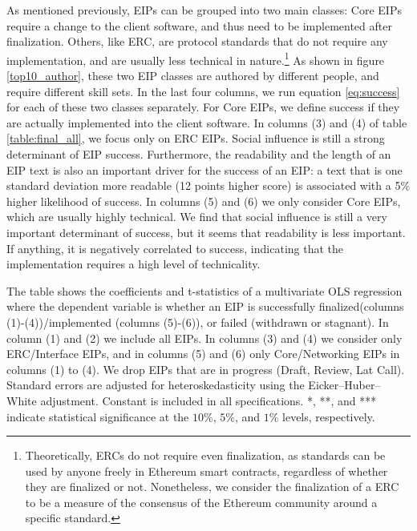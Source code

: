 \documentclass[No]{AEA}
\begin{document}
 As mentioned previously, EIPs can be grouped into two main classes: Core EIPs require a change to the client software, and thus need to be implemented after finalization. Others, like ERC, are protocol standards that do not require any implementation, and are usually less technical in nature.\footnote{Theoretically, ERCs do not require even finalization, as standards can be used by anyone freely in Ethereum smart contracts, regardless of whether they are finalized or not. Nonetheless, we consider the finalization of a ERC to be a measure of the consensus of the Ethereum community around a specific standard.} As shown in figure \ref{top10_author}, these two EIP classes are authored by different people, and require different skill sets. In the last four columns, we run equation \ref{eq:success} for each of these two classes separately. For Core EIPs, we define success if they are actually implemented into the client software. In columns (3) and (4) of table \ref{table:final_all}, we focus only on ERC EIPs. Social influence is still a strong determinant of EIP success. Furthermore, the readability and the length of an EIP text is also an important driver for the success of an EIP: a text that is one standard deviation more readable (12 points higher score) is associated with a 5\% higher likelihood of success. In columns (5) and (6) we only consider Core EIPs, which are usually highly technical. We find that social influence is still a very important determinant of success, but it seems that readability is less important. If anything, it is negatively correlated to success, indicating that the implementation requires a high level of technicality.    

\begin{table}
    \caption{EIP Finalization/Implementation}
     \begin{small}
    \begin{minipage}{\textwidth}
      The table shows the coefficients and t-statistics of a multivariate OLS regression where the dependent variable is whether an EIP is successfully finalized(columns (1)-(4))/implemented (columns (5)-(6)), or failed (withdrawn or stagnant). In column (1) and (2) we include all EIPs. In columns (3) and (4) we consider only ERC/Interface EIPs, and in columns (5) and (6) only Core/Networking EIPs in columns (1) to (4). We drop EIPs that are in progress (Draft, Review, Lat Call). Standard errors are adjusted for heteroskedasticity using the Eicker–Huber–White adjustment. Constant is included in all specifications. *, **, and *** indicate statistical significance at the $10\%$, $5\%$, and $1\%$ levels, respectively.   
  \end{minipage}
    \makebox[\textwidth][c]{}
    \label{table:final_all}
         \end{small}
\end{table}
\end{document}
